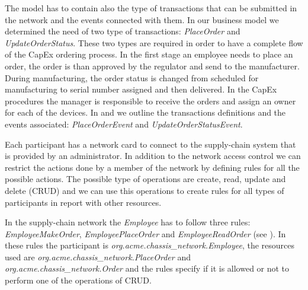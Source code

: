 The model has to contain also the type of transactions that can be submitted in the network and the events connected with them. In our business model we determined the need of two type of transactions: \emph{PlaceOrder} and \emph{UpdateOrderStatus}.
These two types are required in order to have a complete flow of the CapEx ordering process. In the first stage an employee needs to place an order, the order is than approved by the regulator and send to the manufacturer. During manufacturing, the order status is changed from scheduled for manufacturing to serial number assigned and then delivered. In the CapEx procedures the manager is responsible to receive the orders and assign an owner for each of the devices. In  and  we outline the transactions definitions and the events associated: \emph{PlaceOrderEvent} and \emph{UpdateOrderStatusEvent}.



Each participant has a network card to connect to the supply-chain system that is provided by an administrator. In addition to the network access control we can restrict the actions done by a member of the network by defining rules for all the possible actions. The possible type of operations are create, read, update and delete (CRUD) and we can use this operations to create rules for all types of participants in report with other resources. 

In the supply-chain network the \emph{Employee} has to follow three rules: \emph{EmployeeMakeOrder}, \emph{EmployeePlaceOrder} and \emph{EmployeeReadOrder}
(see ). In these rules the participant is \emph{org.acme.chassis_network.Employee}, the resources used are \emph{org.acme.chassis_network.PlaceOrder} and \emph{org.acme.chassis_network.Order} and the rules specify if it is allowed or not to perform one of the operations of CRUD. 



